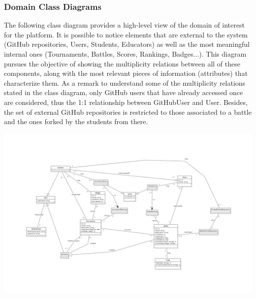 
\begin{minipage}{\linewidth}
\subsubsection{Domain Class Diagrams}

The following class diagram provides a high-level view of the domain of interest for the \app platform. It is possible to notice elements that are external to the system (GitHub repositories, Users, Students, Educators) as well as the most meaningful internal ones (Tournaments, Battles, Scores, Rankings, Badges...). 
This diagram pursues the objective of showing the multiplicity relations between all of these components, along with the most relevant pieces of information (attributes) that characterize them.
As a remark to understand some of the multiplicity relations stated in the class diagram, only GitHub users that have already accessed \app once are considered, thus the 1:1 relationship between GitHubUser and User. Besides, the set of external GitHub repositories is restricted to those associated to a battle and the ones forked by the students from there.
\begin{center}
\includegraphics[angle=90,width=0.85\linewidth]{2Overall_Description/res/ClassDiagram}
\end{center}

\end{minipage}
